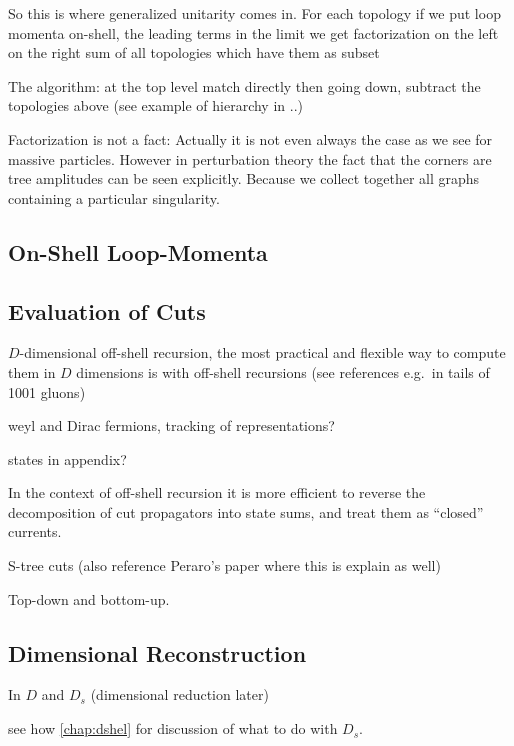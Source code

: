 So this is where generalized unitarity comes in.
For each topology if we put loop momenta on-shell, 
the leading terms in the limit
we get factorization on the left
on the right sum of all topologies which have them as subset

The algorithm:
at the top level match directly
then going down, subtract the topologies above
(see example of hierarchy in ..)


Factorization is not a fact:
Actually it is not even always the case as we see for massive particles.
However in perturbation theory the fact that the corners are tree amplitudes can be seen explicitly.
Because we collect together all graphs containing a particular singularity.



\subsection{On-Shell Loop-Momenta}


\subsection{Evaluation of Cuts}
\label{sec:evluation_of_cuts}

$D$-dimensional off-shell recursion,
the most practical and flexible way to compute them in $D$ dimensions is with off-shell recursions (see references e.g.\ in tails of 1001 gluons)

weyl and Dirac fermions,
tracking of representations?

states in appendix?

In the context of off-shell recursion it is more efficient to reverse
the decomposition of cut propagators into state sums, and treat them
as ``closed'' currents.

 
S-tree cuts (also reference Peraro's paper where this is explain as well)

Top-down and bottom-up.


\subsection{Dimensional Reconstruction}
 In $D$ and $D_s$ (dimensional reduction later)

see how \cref{chap:dshel} for discussion of what to do with $D_s$.

